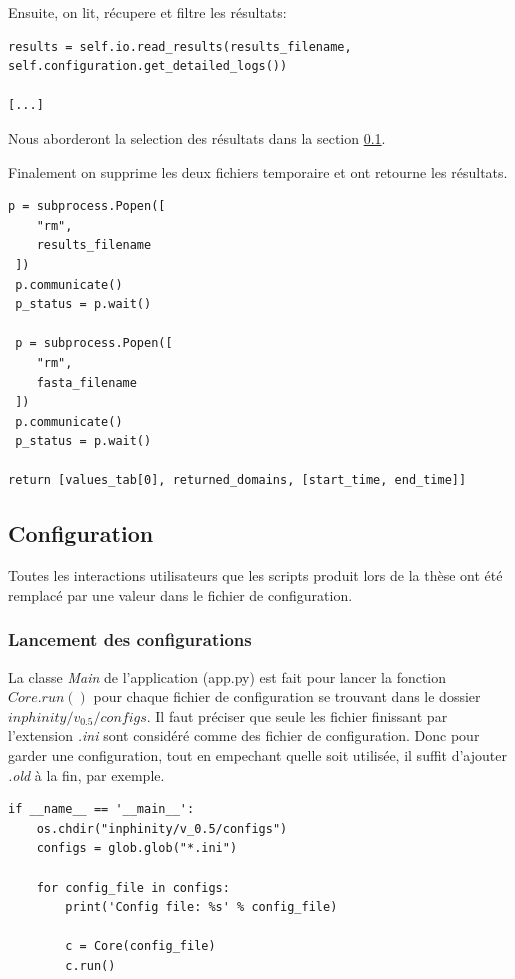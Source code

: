 Ensuite, on lit, récupere et filtre les résultats:

\begin{lstlisting}[frame=single]
results = self.io.read_results(results_filename, self.configuration.get_detailed_logs())

[...]
\end{lstlisting}

Nous aborderont la selection des résultats dans la section \ref{ch:config}.

Finalement on supprime les deux fichiers temporaire et ont retourne les résultats.

\begin{lstlisting}[frame=single]
p = subprocess.Popen([
	"rm",
	results_filename
 ])
 p.communicate()
 p_status = p.wait()

 p = subprocess.Popen([
 	"rm",
 	fasta_filename
 ])
 p.communicate()
 p_status = p.wait()

return [values_tab[0], returned_domains, [start_time, end_time]]
\end{lstlisting}

\subsection{Configuration}
\label{ch:config}

Toutes les interactions utilisateurs que les scripts produit lors de la thèse \thLeite ont été remplacé par une valeur dans le fichier de configuration.

\subsubsection{Lancement des configurations}

La classe \emph{Main} de l'application (app.py) est fait pour lancer la fonction \emph{$Core.run()$} pour chaque fichier de configuration se trouvant dans le dossier \emph{$inphinity/v_0.5/configs$}. Il faut préciser que seule les fichier finissant par l'extension \emph{.ini} sont considéré comme des fichier de configuration. Donc pour garder une configuration, tout en empechant quelle soit utilisée, il suffit d'ajouter \emph{.old} à la fin, par exemple.

\begin{lstlisting}[frame=single]
if __name__ == '__main__':
    os.chdir("inphinity/v_0.5/configs")
    configs = glob.glob("*.ini")

    for config_file in configs:
        print('Config file: %s' % config_file)

        c = Core(config_file)
        c.run()
\end{lstlisting}

